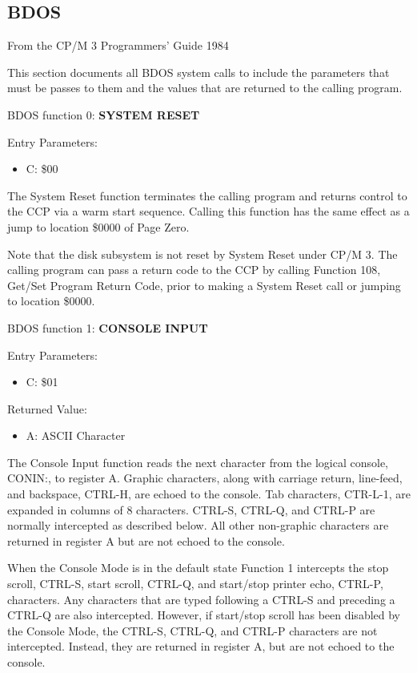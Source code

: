 \subsection{BDOS}
From the CP/M 3 Programmers' Guide 1984

This section documents all BDOS system calls to include the parameters
that must be passes to them and the values that are returned to the
calling program.

BDOS function 0: \textbf{SYSTEM RESET}

Entry Parameters:
\begin{itemize}
\item[] C: \$00
\end{itemize}

The System Reset function terminates the calling program and returns
control to the CCP via a warm start sequence. Calling this function
has the same effect as a jump to location \$0000 of Page Zero.

Note that the disk subsystem is not reset by System Reset under CP/M
3. The calling program can pass a return code to the CCP by calling
Function 108, Get/Set Program Return Code, prior to making a System
Reset call or jumping to location \$0000.

BDOS function 1: \textbf{CONSOLE INPUT}
 
Entry Parameters:
\begin{itemize}
\item[] C: \$01
\end{itemize}
 
Returned Value:
\begin{itemize}
\item[] A: ASCII Character
\end{itemize}

The Console Input function reads the next character from the logical
console, CONIN:, to register A. Graphic characters, along with
carriage return, line-feed, and backspace, CTRL-H, are echoed to the
console. Tab characters, CTR-L-1, are expanded in columns of 8
characters. CTRL-S, CTRL-Q, and CTRL-P are normally intercepted as
described below. All other non-graphic characters are returned in
register A but are not echoed to the console.

When the Console Mode is in the default state Function 1 intercepts
the stop scroll, CTRL-S, start scroll, CTRL-Q, and start/stop printer
echo, CTRL-P, characters. Any characters that are typed following a
CTRL-S and preceding a CTRL-Q are also intercepted. However, if
start/stop scroll has been disabled by the Console Mode, the CTRL-S,
CTRL-Q, and CTRL-P characters are not intercepted. Instead, they are
returned in register A, but are not echoed to the console.

